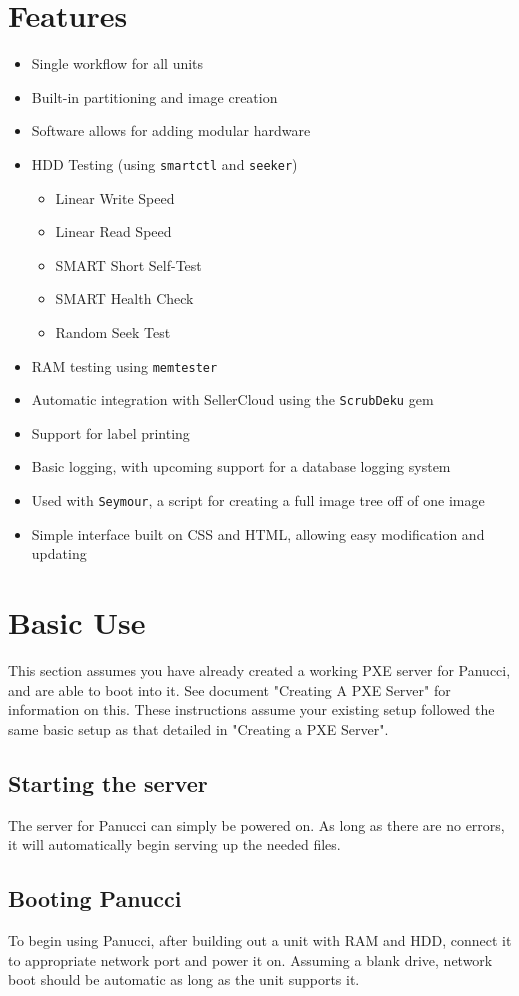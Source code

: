 \documentclass{article}
\begin{document}
\begin{flushleft}
\section{Features}
\begin{itemize}
  \item Single workflow for all units
  \item Built-in partitioning and image creation
  \item Software allows for adding modular hardware
  \item HDD Testing (using \verb|smartctl| and \verb|seeker|)
  \begin{itemize}
    \item Linear Write Speed
    \item Linear Read Speed
    \item SMART Short Self-Test
    \item SMART Health Check
    \item Random Seek Test
  \end{itemize}
  \item RAM testing using \verb|memtester|
  \item Automatic integration with SellerCloud using the \verb|ScrubDeku| gem
  \item Support for label printing
  \item Basic logging, with upcoming support for a database logging system
  \item Used with \verb|Seymour|, a script for creating a full image tree off of one image
  \item Simple interface built on CSS and HTML, allowing easy modification and updating
\end{itemize}
\pagebreak
\section{Basic Use}
This section assumes you have already created a working PXE server for Panucci, and are able to boot into it.  See document "Creating A PXE Server" for information on this.  These instructions assume your existing setup followed the same basic setup as that detailed in "Creating a PXE Server".
\subsection{Starting the server}
The server for Panucci can simply be powered on.  As long as there are no errors, it will automatically begin serving up the needed files.
\subsection{Booting Panucci}
To begin using Panucci, after building out a unit with RAM and HDD, connect it to appropriate network port and power it on.  Assuming a blank drive, network boot should be automatic as long as the unit supports it.

\end{flushleft}
\end{document}
